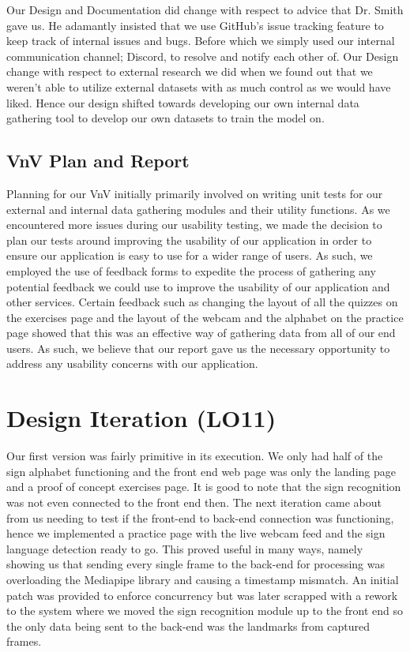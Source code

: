 \documentclass{article}
\begin{document}
Our Design and Documentation did change with respect to advice that Dr. Smith gave us. He adamantly insisted that we use GitHub's issue tracking feature to keep track of internal issues and bugs. Before which we simply used our internal communication channel; Discord, to resolve and notify each other of. Our Design change with respect to external research we did when we found out that we weren't able to utilize external datasets with as much control as we would have liked. Hence our design shifted towards developing our own internal data gathering tool to develop our own datasets to train the model on. 

\subsection{VnV Plan and Report}

Planning for our VnV initially primarily involved on writing unit tests for our external and internal data gathering modules and their utility functions. As we encountered more issues during our usability testing, we made the decision to plan our tests around improving the usability of our application in order to \\ ensure our application is easy to use for a wider range of users. As such, we employed the use of feedback forms to expedite the process of gathering any potential feedback we could use to improve the usability of our application and other services. Certain feedback such as changing the layout of all the quizzes on the exercises page and the layout of the webcam and the alphabet on the practice page showed that this was an effective way of gathering data from all of our end users. As such, we believe that our report gave us the necessary opportunity to address any usability concerns with our application.

\section{Design Iteration (LO11)}


Our first version was fairly primitive in its execution. We only had half of the sign alphabet functioning and the front end web page was only the landing page and a proof of concept exercises page. It is good to note that the sign recognition was not even connected to the front end then. The next iteration came about from us needing to test if the front-end to back-end connection was functioning, hence we implemented a practice page with the live webcam feed and the sign language detection ready to go. This proved useful in many ways, namely showing us that sending every single frame to the back-end for processing was overloading the Mediapipe library and causing a timestamp mismatch. An initial patch was provided to enforce concurrency but was later scrapped with a rework to the system where we moved the sign recognition module up to the front end so the only data being sent to the back-end was the landmarks from captured frames.
\end{document}
